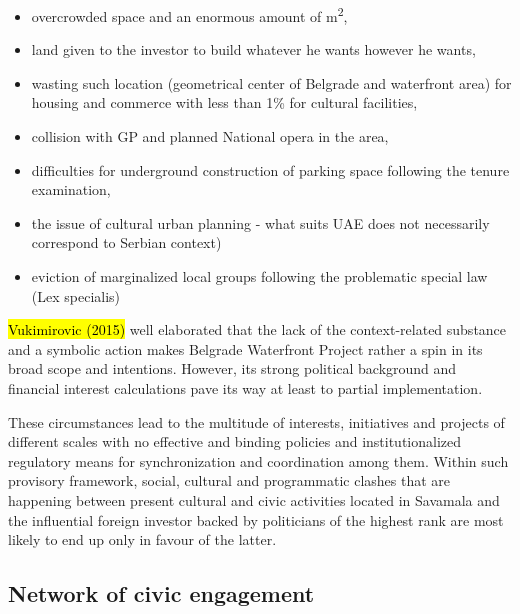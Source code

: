 \documentclass[11pt]{report}
\begin{document}
\begin{itemize}
\begin{itemize}
\item overcrowded space and an enormous amount of m\textsuperscript{2},
\item land given to the investor to build whatever he wants however he wants,
\item wasting such location (geometrical center of Belgrade and waterfront area) for housing and commerce with less than 1\% for cultural facilities,
\item collision with GP and planned National opera in the area,
\item difficulties for underground construction of parking space following the tenure examination,
\item the issue of cultural urban planning - what suits UAE does not necessarily correspond to Serbian context)
\item eviction of marginalized local groups following the problematic special law (Lex specialis)
\end{itemize}

\hl{Vukimirovic (2015)} well elaborated that the lack of the context-related substance and a symbolic action makes Belgrade Waterfront Project rather a spin in its broad scope and intentions.
However, its strong political background and financial interest calculations pave its way at least to partial implementation.
\end{itemize}

These circumstances lead to the multitude of interests, initiatives and projects of different scales with no effective and binding policies and institutionalized regulatory means for synchronization and coordination among them.
Within such provisory framework, social, cultural and programmatic clashes that are happening between present cultural and civic activities located in Savamala and the influential foreign investor backed by politicians of the highest rank are most likely to end up only in favour of the latter.

\subsection{Network of civic engagement}
\end{document}
